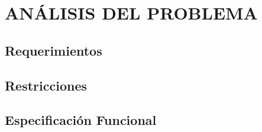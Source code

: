 \setcounter{subsection}{0}
\section{ANÁLISIS DEL PROBLEMA}


\subsection{Requerimientos}

\subsection{Restricciones}

\subsection{Especificación Funcional}


